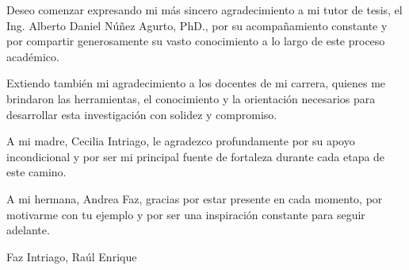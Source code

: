 Deseo comenzar expresando mi más sincero agradecimiento a mi tutor de tesis, el Ing. Alberto Daniel Núñez Agurto, PhD., por su acompañamiento constante y por compartir generosamente su vasto conocimiento a lo largo de este proceso académico.

Extiendo también mi agradecimiento a los docentes de mi carrera, quienes me brindaron las herramientas, el conocimiento y la orientación necesarios para desarrollar esta investigación con solidez y compromiso.

A mi madre, Cecilia Intriago, le agradezco profundamente por su apoyo incondicional y por ser mi principal fuente de fortaleza durante cada etapa de este camino.

A mi hermana, Andrea Faz, gracias por estar presente en cada momento, por motivarme con tu ejemplo y por ser una inspiración constante para seguir adelante.



\begin{flushright}
Faz Intriago, Raúl Enrique
\end{flushright}


